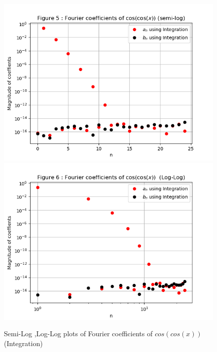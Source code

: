 \documentclass[11pt, a4paper]{article}
\begin{document}
\begin{figure}[!tbh]
     \centering
     \includegraphics[scale=0.8]{./../Extras/7.png}  
     \includegraphics[scale=0.8]{./../Extras/8.png}  
     \caption{Semi-Log ,Log-Log plots of Fourier coefficients of $cos(cos(x))$ (Integration)}
\end{figure}
\clearpage
\end{document}

